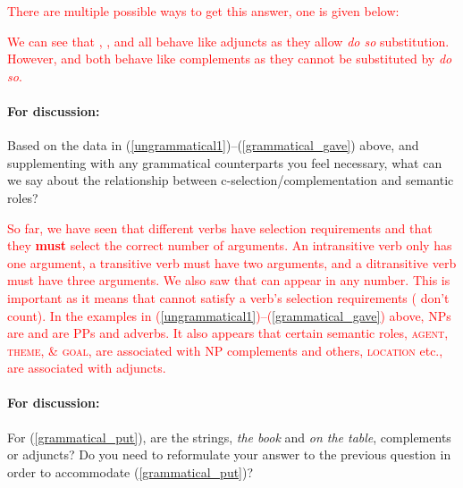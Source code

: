 \documentclass{article}
\begin{document}
\textcolor{red}{There are multiple possible ways to get this answer, one is given below:
\begin{exe}
\end{exe}
We can see that , , and  all behave like adjuncts as they allow \emph{do so} substitution.
However,  and  both behave like complements as they cannot be substituted by \emph{do so}.}

\paragraph{For discussion:} Based on the data in (\ref{ungrammatical1})--(\ref{grammatical_gave}) above, and supplementing with any grammatical counterparts you feel necessary, what can we say about the relationship between c-selection/complementation and semantic roles?

\textcolor{red}{So far, we have seen that different verbs have selection requirements and that they \textbf{must} select the correct number of arguments.
An intransitive verb only has one argument, a transitive verb must have two arguments, and a ditransitive verb must have three arguments.
We also saw that  can appear in any number.
This is important as it means that cannot satisfy a verb's selection requirements ( don't count).
In the examples in (\ref{ungrammatical1})--(\ref{grammatical_gave}) above, NPs are  and  are PPs and adverbs.
It also appears that certain semantic roles, \textsc{agent}, \textsc{theme}, \& \textsc{goal}, are associated with NP complements and others, \textsc{location} etc., are associated with adjuncts.}

\paragraph{For discussion:} For (\ref{grammatical_put}), are the strings, \emph{the book} and \emph{on the table}, complements or adjuncts? 
Do you need to reformulate your answer to the previous question in order to accommodate (\ref{grammatical_put})?
\begin{exe}
    \label{grammatical_put}
\end{exe}
\end{document}
